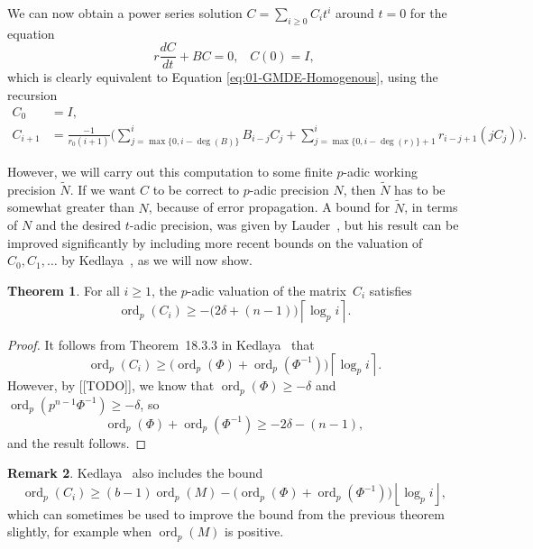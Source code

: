 \documentclass[a4paper,11pt]{article}
\numberwithin{equation}{section}
\providecommand{\floor}[1]{\left\lfloor#1\right\rfloor}   %
\providecommand{\ceil}[1]{\left\lceil#1\right\rceil}   %
\DeclareMathOperator{\ord}{ord}          %
\theoremstyle{definition}
\newtheorem{thm}{Theorem}[section]
\newtheorem{rem}[thm]{Remark}
\begin{document}
We can now obtain a power series solution $C = \sum_{i \geq 0} C_i t^i$ around $t=0$ for 
the equation
\begin{equation*}
r \frac{dC}{dt} + B C = 0, \; \; \; C(0)=I,
\end{equation*}
which is clearly equivalent to Equation \eqref{eq:01-GMDE-Homogenous}, using the recursion 
\begin{align} \label{eq:Ci}
C_0 &= I, \\ \label{eq:recursion}
C_{i+1} &= \frac{-1}{r_0 (i+1)} \biggl(
    \sum_{j=\max{\{0,i-\deg(B)\}}}^i B_{i-j} C_j + 
    \sum_{j=\max{\{0,i-\deg(r)\}}+1}^i r_{i-j+1} (j C_j) \biggr).
\end{align}

However, we will carry out this computation to some finite $p$-adic working precision $\tilde{N}$. If
we want $C$ to be correct to $p$-adic precision $N$, then $\tilde{N}$ has to be somewhat greater than $N$, 
because of error propagation. A bound for $\tilde{N}$, in terms of $N$ and the desired $t$-adic precision, 
was given by Lauder~\citep[Theorem~5.1]{Lauder2006}, but his result can be improved significantly by including 
more recent bounds on the valuation of $C_0, C_1, \dotsc$ by Kedlaya~\citep{Kedlaya2010}, as we will now show.  

\begin{thm} \label{thm:valC}
For all $i \geq 1$, the $p$-adic valuation of the matrix~$C_i$ 
satisfies 
\begin{equation*}
\ord_p(C_i) \geq - \bigl(2 \delta + (n - 1)\bigr) \ceil{\log_p i}.
\end{equation*}
\end{thm}

\begin{proof}
It follows from Theorem~{18.3.3} in Kedlaya~\citep{Kedlaya2010} that
\begin{equation*}
\ord_p(C_i) \geq \bigl( \ord_p(\Phi) + \ord_p(\Phi^{-1}) \bigr) \ceil{\log_p i}.
\end{equation*}
However, by [[TODO]], we know that $\ord_p(\Phi) \geq -\delta$ and 
$\ord_p(p^{n-1}\Phi^{-1}) \geq -\delta$, so
\begin{equation*}
\ord_p(\Phi) + \ord_p(\Phi^{-1}) \geq - 2 \delta - (n-1),
\end{equation*}
and the result follows.
\end{proof}

\begin{rem}
Kedlaya~\citep[Remark~18.3.4]{Kedlaya2010} also includes the bound
\begin{equation*}
\ord_p(C_i) \geq (b - 1) \ord_p(M) 
            - \bigl( \ord_p(\Phi) + \ord_p(\Phi^{-1}) \bigr) \floor{\log_p i},
\end{equation*}
which can sometimes be used to improve the bound from the previous theorem slightly, 
for example when $\ord_p(M)$ is positive.
\end{rem}
\end{document}
